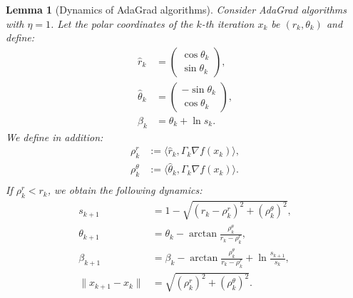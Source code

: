\documentclass[10pt,a4paper]{amsart}
\newtheorem{lemma}{Lemma}
\newcommand{\innp}[2]{\langle #1, #2 \rangle}
\begin{document}
\begin{lemma}[Dynamics of AdaGrad algorithms]
    \label{lemma:dynamics-adagrad-algos}
    Consider AdaGrad algorithms with $\eta = 1$. Let the polar coordinates of the $k$-th iteration $x_k$ be $(r_k, \theta_k)$ and define: 
    \begin{equation*}
        \begin{aligned}
            \hat{r}_k &= \begin{pmatrix}
                \cos\theta_k \\ \sin\theta_k
            \end{pmatrix}, \\
            \hat{\theta}_k &= \begin{pmatrix}
                -\sin\theta_k \\ \cos\theta_k
            \end{pmatrix},\\
            \beta_k &= \theta_k + \ln s_k.
        \end{aligned}
    \end{equation*}
    We define in addition:
    \begin{equation*}
        \begin{aligned}
            \rho_{k}^r &:= \innp{\hat{r}_k}{\Gamma_k\nabla f(x_k)},\\
            \rho_{k}^\theta &:= \innp{\hat{\theta}_k}{\Gamma_k\nabla f(x_k)}.\\
        \end{aligned}
    \end{equation*}
    If $\rho_k^r < r_k$, we obtain the following dynamics: 
    \begin{equation}
        \label{eq:dynamics-s-beta}
        \begin{aligned}
            s_{k + 1} &= 1 - \sqrt{(r_k - \rho_k^r)^2 + (\rho_k^\theta)^2},\\
            \theta_{k+1} &= \theta_k - \arctan \frac{\rho_k^\theta}{r_k - \rho^r_k},\\
            \beta_{k + 1} &= \beta_k - \arctan \frac{\rho_k^\theta}{r_k - \rho^r_k} + \ln \frac{s_{k+1}}{s_{k}},\\
            \|x_{k + 1} - x_k\| &= \sqrt{(\rho_k^r)^2 + (\rho_k^\theta)^2}.
        \end{aligned}
    \end{equation}
\end{lemma}
\end{document}
